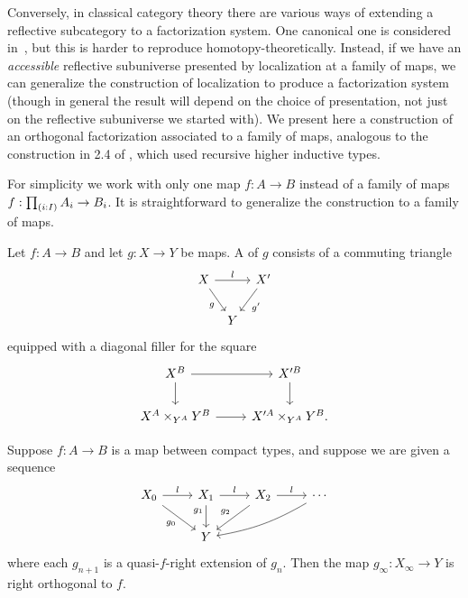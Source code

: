 Conversely, in classical category theory there are various ways of extending a reflective subcategory to a factorization system.
One canonical one is considered in~\cite{chk:reflocfact}, but this is harder to reproduce homotopy-theoretically.
Instead, if we have an \emph{accessible} reflective subuniverse presented by localization at a family of maps, we can generalize the construction of localization to produce a factorization system (though in general the result will depend on the choice of presentation, not just on the reflective subuniverse we started with). We present here a construction of an orthogonal factorization associated to a family of maps, analogous to the construction in 2.4 of \cite{RijkeShulmanSpitters}, which used recursive higher inductive types.  

For simplicity we work with only one map $f:A\to B$ instead of a family of maps $f:\prd{i:I}A_i\to B_i$.
It is straightforward to generalize the construction to a family of maps.

\begin{defn}
Let $f:A\to B$ and let $g:X\to Y$ be maps. A  of $g$ consists of a commuting triangle
\begin{equation*}
\begin{tikzcd}[column sep=tiny]
X \arrow[rr,"l"] \arrow[dr,swap,"g"] & & X' \arrow[dl,"g'"] \\
& Y
\end{tikzcd}
\end{equation*}
equipped with a diagonal filler for the square
\begin{equation*}
\begin{tikzcd}
X^B \arrow[r] \arrow[d] & X'^B \arrow[d] \\
X^A\times_{Y^A}Y^B \arrow[r] & X'^A\times_{Y^A}Y^B.
\end{tikzcd}
\end{equation*}
\end{defn}

\begin{prp}
Suppose $f:A\to B$ is a map between compact types, and suppose we are given a sequence
\begin{equation*}
\begin{tikzcd}
X_0 \arrow[r,"l"] \arrow[dr,swap,"g_0"] & X_1 \arrow[r,"l"] \arrow[d,swap,"g_1" near start] & X_2 \arrow[r,"l"] \arrow[dl,swap,"g_2"] & \cdots \arrow[dll,bend left=10] \\
& Y
\end{tikzcd}
\end{equation*}
where each $g_{n+1}$ is a quasi-$f$-right extension of $g_n$. Then the map $g_\infty:X_\infty\to Y$ is right orthogonal to $f$.
\end{prp}

